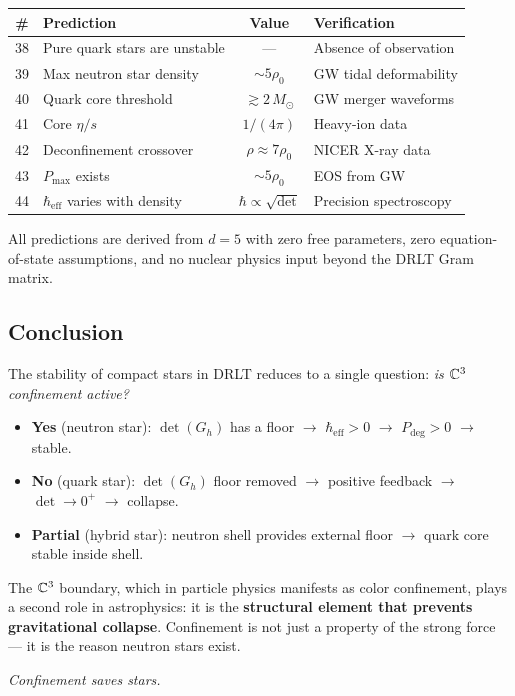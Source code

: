 \begin{center}
\begin{tabular}{clcl}
\hline
\# & Prediction & Value & Verification \\
\hline
38 & Pure quark stars are unstable & --- & Absence of observation \\
39 & Max neutron star density & $\sim 5\rho_0$ & GW tidal deformability \\
40 & Quark core threshold & $\gtrsim 2\,M_\odot$ & GW merger waveforms \\
41 & Core $\eta/s$ & $1/(4\pi)$ & Heavy-ion data \\
42 & Deconfinement crossover & $\rho \approx 7\rho_0$ & NICER X-ray data \\
43 & $P_\text{max}$ exists & $\sim 5\rho_0$ & EOS from GW \\
44 & $\hbar_\text{eff}$ varies with density & $\hbar \propto \sqrt{\det}$ & Precision spectroscopy \\
\hline
\end{tabular}
\end{center}

All predictions are derived from $d = 5$ with zero free parameters, zero equation-of-state assumptions, and no nuclear physics input beyond the DRLT Gram matrix.

\subsection{Conclusion}

The stability of compact stars in DRLT reduces to a single question: \emph{is $\mathbb{C}^3$ confinement active?}

\begin{itemize}
\item \textbf{Yes} (neutron star): $\det(G_h)$ has a floor $\to$ $\hbar_\text{eff} > 0$ $\to$ $P_\text{deg} > 0$ $\to$ stable.
\item \textbf{No} (quark star): $\det(G_h)$ floor removed $\to$ positive feedback $\to$ $\det \to 0^+$ $\to$ collapse.
\item \textbf{Partial} (hybrid star): neutron shell provides external floor $\to$ quark core stable inside shell.
\end{itemize}

The $\mathbb{C}^3$ boundary, which in particle physics manifests as color confinement, plays a second role in astrophysics: it is the \textbf{structural element that prevents gravitational collapse}. Confinement is not just a property of the strong force --- it is the reason neutron stars exist.

\begin{center}
\emph{Confinement saves stars.}
\end{center}
